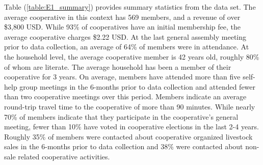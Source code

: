 \documentclass[11pt]{article}
\begin{document}
Table (\ref{table:E1_summary}) provides summary statistics from the data set. The average cooperative in this context has 569 members, and a revenue of over \$3,800 USD. While 93\% of cooperatives have an initial membership fee, the average cooperative charges \$2.22 USD. At the last general assembly meeting prior to data collection, an average of 64\% of members were in attendance. At the household level, the average cooperative member is 42 years old, roughly 80\% of whom are literate. The average household has been a member of their cooperative for 3 years. On average, members have attended more than five self-help group meetings in the 6-months prior to data collection and attended fewer than two cooperative meetings over this period. Members indicate an average round-trip travel time to the cooperative of more than 90 minutes. While nearly 70\% of members indicate that they participate in the cooperative's general meeting, fewer than 10\% have voted in cooperative elections in the last 2-4 years. Roughly 35\% of members were contacted about cooperative organized livestock sales in the 6-months prior to data collection and 38\% were contacted about non-sale related cooperative activities. 
\end{document}
